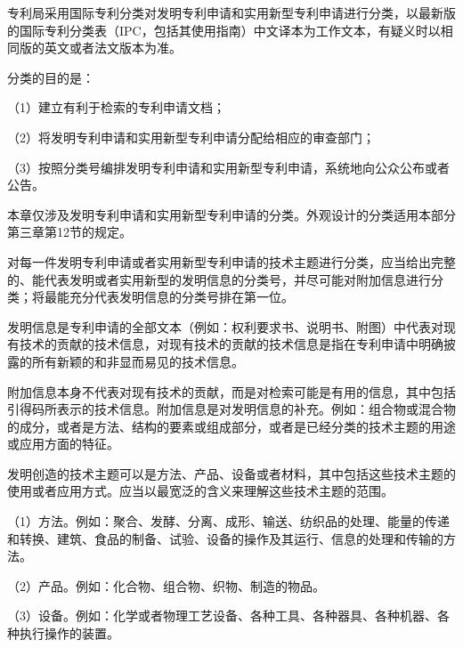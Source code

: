 专利局采用国际专利分类对发明专利申请和实用新型专利申请进行分类，以最新版的国际专利分类表（IPC，包括其使用指南）中文译本为工作文本，有疑义时以相同版的英文或者法文版本为准。

分类的目的是：

{\setlength{\parindent}{17.1bp}（1）建立有利于检索的专利申请文档；\par}

{\setlength{\parindent}{17.1bp}（2）将发明专利申请和实用新型专利申请分配给相应的审查部门；\par}

{\setlength{\parindent}{17.1bp}（3）按照分类号编排发明专利申请和实用新型专利申请，系统地向公众公布或者公告。\par}

本章仅涉及发明专利申请和实用新型专利申请的分类。外观设计的分类适用本部分第三章第12节的规定。

对每一件发明专利申请或者实用新型专利申请的技术主题进行分类，应当给出完整的、能代表发明或者实用新型的发明信息的分类号，并尽可能对附加信息进行分类；将最能充分代表发明信息的分类号排在第一位。

发明信息是专利申请的全部文本（例如：权利要求书、说明书、附图）中代表对现有技术的贡献的技术信息，对现有技术的贡献的技术信息是指在专利申请中明确披露的所有新颖的和非显而易见的技术信息。

附加信息本身不代表对现有技术的贡献，而是对检索可能是有用的信息，其中包括引得码所表示的技术信息。附加信息是对发明信息的补充。例如：组合物或混合物的成分，或者是方法、结构的要素或组成部分，或者是已经分类的技术主题的用途或应用方面的特征。

发明创造的技术主题可以是方法、产品、设备或者材料，其中包括这些技术主题的使用或者应用方式。应当以最宽泛的含义来理解这些技术主题的范围。

{\setlength{\parindent}{17.1bp}（1）方法。例如：聚合、发酵、分离、成形、输送、纺织品的处理、能量的传递和转换、建筑、食品的制备、试验、设备的操作及其运行、信息的处理和传输的方法。\par}

{\setlength{\parindent}{17.1bp}（2）产品。例如：化合物、组合物、织物、制造的物品。\par}

{\setlength{\parindent}{17.1bp}（3）设备。例如：化学或者物理工艺设备、各种工具、各种器具、各种机器、各种执行操作的装置。\par}

